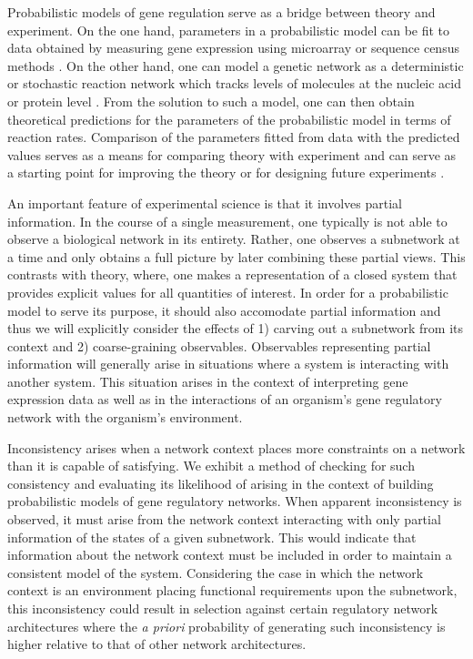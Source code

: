 Probabilistic models of gene regulation serve as a bridge between theory and experiment.  On the one hand, parameters in a probabilistic model can be fit to data obtained by measuring gene expression using microarray or sequence census methods \cite{Friedman2008a,Zhang2013}.  On the other hand, one can model a genetic network as a deterministic or stochastic reaction network which tracks levels of molecules at the nucleic acid or protein level \cite{Alon2006,Voit2012}.  From the solution to such a model, one can then obtain theoretical predictions for the parameters of the probabilistic model in terms of reaction rates.  Comparison of the parameters fitted from data with the predicted values serves as a means for comparing theory with experiment and can serve as a starting point for improving the theory or for designing future experiments \cite{Tonsing2014}.

An important feature of experimental science is that it involves partial information.  In the course of a single measurement, one typically is not able to observe a biological network in its entirety.  Rather, one observes a subnetwork at a time and only obtains a full picture by later combining these partial views.  This contrasts with theory, where, one makes a representation of a closed system that provides explicit values for all quantities of interest.  In order for a probabilistic model to serve its purpose, it should also accomodate partial information and thus we will explicitly consider the effects of 1) carving out a subnetwork from its context and 2) coarse-graining observables. Observables representing partial information will generally arise in situations where a system is interacting with another system. This situation arises in the context of interpreting gene expression data as well as in the interactions of an organism's gene regulatory network with the organism's environment.


Inconsistency arises when a network context places more constraints on a network than it is capable of satisfying. We exhibit a method of checking for such consistency and evaluating its likelihood of arising in the context of building probabilistic models of gene regulatory networks. When apparent inconsistency is observed, it must arise from the network context interacting with only partial information of the states of a given subnetwork. This would indicate that information about the network context must be included in order to maintain a consistent model of the system. Considering the case in which the network context is an environment placing functional requirements upon the subnetwork, this inconsistency could result in selection against certain regulatory network architectures where the \emph{a priori} probability of generating such inconsistency is higher relative to that of other network architectures.

